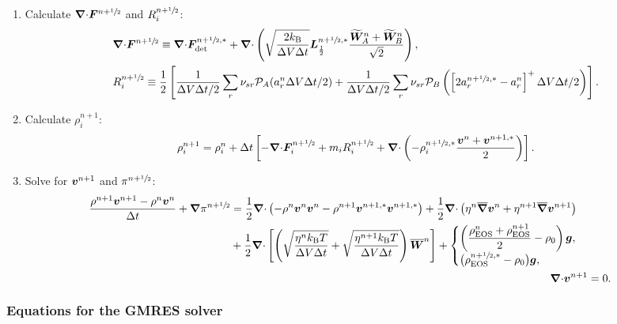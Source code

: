 \documentclass[
10pt
showpacs, showkeys,
amsmath,amssymb,
aps,
pre,
floatfix,
]{revtex4-1}
\newcommand{\divg}{{\V\nabla\cdot}}                       %
\begin{document}
\begin{enumerate}
\item Calculate $\divg\V{F}^{n+\myhalf}$ and $R^{n+\sfrac{1}{2}}_i$:
\begin{align}
&\divg\V{F}^{n+\myhalf} \equiv \divg\V{F}_\mathrm{det}^{n+\myhalf,*} +
\divg\left( \sqrt{ \frac{2k_\mathrm{B}}{\D{V}\D{t}} } \V{L}^{n+\myhalf,*}_{\frac12} \frac{\widetilde{\V{W}}^n_A+\widetilde{\V{W}}^n_B}{\sqrt{2}} \right),
\\
&R^{n+\myhalf}_i \equiv \frac{1}{2}\left[ \frac{1}{\D{V}\D{t}/2} \sum_r \nu_{sr} \mathcal{P}_A(a^n_r\D{V}\D{t}/2) + \frac{1}{\D{V}\D{t}/2} \sum_r \nu_{sr} \mathcal{P}_B\left( \left[ 2 a^{n+\myhalf,*}_r - a^n_r \right]^+ \D{V}\D{t}/2 \right) \right].
\end{align}

\item Calculate $\rho^{n+1}_i$:
\begin{equation}
\rho^{n+1}_i = \rho^n_i + \D{t} \left[ -\divg\V{F}^{n+\myhalf}_i + m_i R^{n+\myhalf}_i 
+ \divg\left( -\rho^{n+\myhalf,*}_i \frac{\V{v}^n + \V{v}^{n+1,*}}{2} \right) \right].
\end{equation} 

\item Solve for $\boldsymbol{v}^{n+1}$ and $\pi^{n+\sfrac{1}{2}}$:
\begin{align}
\label{boussinesq_stokes_v_2nd}
\begin{split}
\frac{\rho^{n+1}\V{v}^{n+1}-\rho^n\V{v}^n}{\D{t}} + \grad\pi^{n+\myhalf}
&= \frac{1}{2}\divg\left(-\rho^n\V{v}^n\V{v}^n-\rho^{n+1}\V{v}^{n+1,*}\V{v}^{n+1,*}\right) 
+ \frac{1}{2}\divg\left( \eta^n \overline{\grad}\V{v}^n + \eta^{n+1} \overline{\grad}\V{v}^{n+1} \right) \\
&+ \frac{1}{2}\divg\left[\left( \sqrt{\frac{\eta^n k_\mathrm{B}T}{\D{V}\D{t}}} + \sqrt{\frac{\eta^{n+1} k_\mathrm{B}T}{\D{V}\D{t}}} \right) \overline{\V{W}}^n \right]
+ 
\begin{cases}
\displaystyle \left(\frac{\rho^n_\mathrm{EOS}+\rho^{n+1}_\mathrm{EOS}}{2}-\rho_0\right)\V{g}, \\
\big(\rho^{n+\myhalf,*}_\mathrm{EOS}-\rho_0\big)\V{g}, 
\end{cases}
\end{split} \\
\label{boussinesq_stokes_p_2nd}
\divg\V{v}^{n+1} & = 0.
\end{align}

\end{enumerate}



\subsubsection*{Equations for the GMRES solver}
\end{document}

